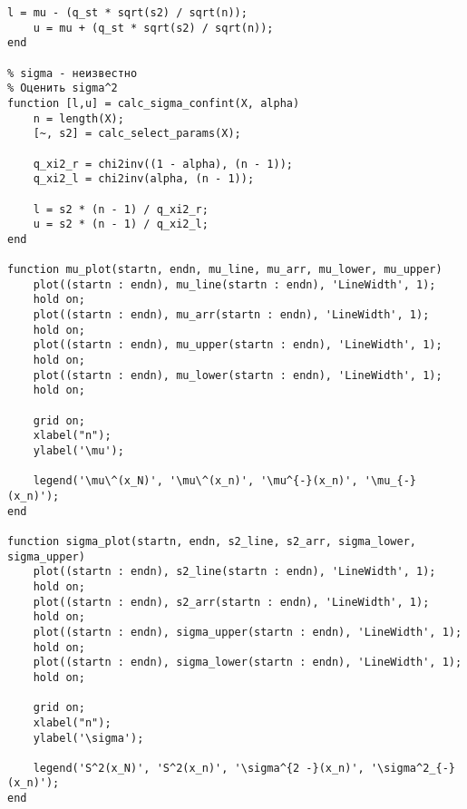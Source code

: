 \begin{center}
\begin{lstlisting}[label=lst:lab]
    l = mu - (q_st * sqrt(s2) / sqrt(n));
    u = mu + (q_st * sqrt(s2) / sqrt(n));
end

% sigma - неизвестно
% Оценить sigma^2
function [l,u] = calc_sigma_confint(X, alpha)
    n = length(X);
    [~, s2] = calc_select_params(X);

    q_xi2_r = chi2inv((1 - alpha), (n - 1));
    q_xi2_l = chi2inv(alpha, (n - 1));
    
    l = s2 * (n - 1) / q_xi2_r;
    u = s2 * (n - 1) / q_xi2_l;
end

function mu_plot(startn, endn, mu_line, mu_arr, mu_lower, mu_upper)
    plot((startn : endn), mu_line(startn : endn), 'LineWidth', 1);
    hold on;
    plot((startn : endn), mu_arr(startn : endn), 'LineWidth', 1);
    hold on;
    plot((startn : endn), mu_upper(startn : endn), 'LineWidth', 1);
    hold on;
    plot((startn : endn), mu_lower(startn : endn), 'LineWidth', 1);
    hold on;
    
    grid on;
    xlabel("n");
    ylabel('\mu');

    legend('\mu\^(x_N)', '\mu\^(x_n)', '\mu^{-}(x_n)', '\mu_{-}(x_n)');
end

function sigma_plot(startn, endn, s2_line, s2_arr, sigma_lower, sigma_upper)
    plot((startn : endn), s2_line(startn : endn), 'LineWidth', 1);
    hold on;
    plot((startn : endn), s2_arr(startn : endn), 'LineWidth', 1);
    hold on;
    plot((startn : endn), sigma_upper(startn : endn), 'LineWidth', 1);
    hold on;
    plot((startn : endn), sigma_lower(startn : endn), 'LineWidth', 1);
    hold on;
    
    grid on;
    xlabel("n");
    ylabel('\sigma');

    legend('S^2(x_N)', 'S^2(x_n)', '\sigma^{2 -}(x_n)', '\sigma^2_{-}(x_n)');
end
\end{lstlisting}
\end{center}